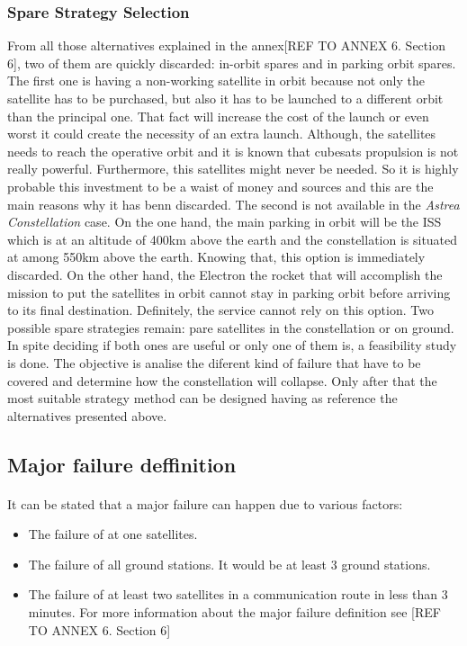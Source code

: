 \subsubsection{Spare Strategy Selection}
From all those alternatives explained in the annex[{REF TO ANNEX 6. Section 6}], two of them  are quickly discarded: in-orbit spares and in parking orbit spares. The first one is having a non-working satellite in orbit because not only the satellite has to be purchased, but also it has to be launched to a different orbit than the principal one. That fact will increase the cost of the launch or even worst it could create the necessity of an extra launch. Although, the satellites needs to reach the operative orbit and it is known that cubesats propulsion is not really powerful. Furthermore, this satellites might never be needed. So it is highly probable this investment to be a waist of money and sources and this are the main reasons why it has benn discarded.
\newline\newline
The second is not available in the \textit{Astrea Constellation} case. On the one hand, the main parking in orbit will be the ISS which is at an altitude of 400km above the earth and the constellation is situated at among 550km above the earth. Knowing that, this option is immediately discarded. On the other hand, the Electron the rocket that will accomplish the mission to put the satellites in orbit cannot stay in parking orbit before arriving to its final destination. Definitely, the service cannot rely on this option.
\newline\newline
Two possible spare strategies remain: pare satellites in the constellation or on ground. In spite deciding if both ones are useful or only one of them is, a feasibility study is done. The objective is analise the diferent kind of failure that have to be covered and determine how the constellation will collapse. Only after that the most suitable strategy method can be designed having as reference the alternatives presented above. 
\subsection{Major failure deffinition}

\paragraph{}It can be stated that a major failure can happen due to various factors:
\begin{itemize}
\item The failure of at one satellites.
\item The failure of all ground stations. It would be at least 3 ground stations.
\item The failure of at least two satellites in a communication route in less than 3 minutes.
\newline\newline
For more information about the major failure definition see [{REF TO ANNEX 6. Section 6}]
\end{itemize}


